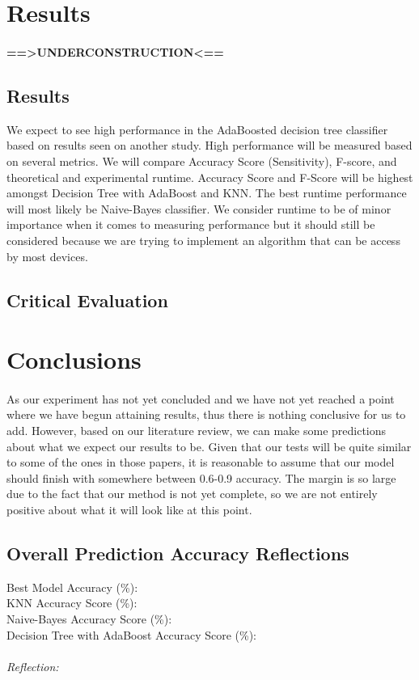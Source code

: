 \documentclass{article}
\begin{document}
\section{Results}
\paragraph{==>UNDERCONSTRUCTION<==}
\subsection{Results}
We expect to see high performance in the AdaBoosted decision tree classifier based on results seen on another study. High performance will be measured based on several metrics. We will compare Accuracy Score (Sensitivity), F-score, and theoretical and experimental runtime. Accuracy Score and F-Score will be highest amongst Decision Tree with AdaBoost and KNN. The best runtime performance will most likely be Naive-Bayes classifier. We consider runtime to be of minor importance when it comes to measuring performance but it should still be considered because we are trying to implement an algorithm that can be access by most devices. 
\subsection{Critical Evaluation}


\section{Conclusions}
\paragraph{}
As our experiment has not yet concluded and we have not yet reached a point where we have begun attaining results, thus there is nothing conclusive for us to add. However, based on our literature review, we can make some predictions about what we expect our results to be. Given that our tests will be quite similar to some of the ones in those papers, it is reasonable to assume that our model should finish with somewhere between 0.6-0.9 accuracy. The margin is so large due to the fact that our method is not yet complete, so we are not entirely positive about what it will look like at this point.
\subsection{Overall Prediction Accuracy Reflections}
Best Model Accuracy (\%): \\
KNN Accuracy Score (\%):  \\
Naive-Bayes Accuracy Score (\%):  \\
Decision Tree with AdaBoost Accuracy Score (\%):  \\
\\
\textit{Reflection:} 
\end{document}

